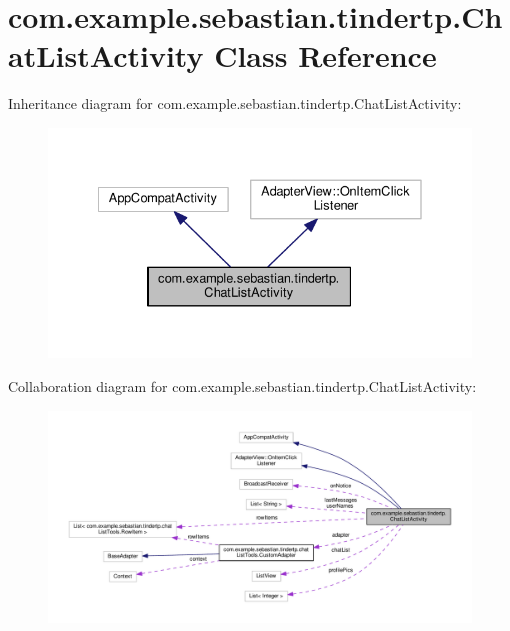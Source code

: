 \hypertarget{classcom_1_1example_1_1sebastian_1_1tindertp_1_1ChatListActivity}{}\section{com.\+example.\+sebastian.\+tindertp.\+Chat\+List\+Activity Class Reference}
\label{classcom_1_1example_1_1sebastian_1_1tindertp_1_1ChatListActivity}


Inheritance diagram for com.\+example.\+sebastian.\+tindertp.\+Chat\+List\+Activity\+:
\nopagebreak
\begin{figure}[H]
\begin{center}
\leavevmode
\includegraphics[width=331pt]{classcom_1_1example_1_1sebastian_1_1tindertp_1_1ChatListActivity__inherit__graph}
\end{center}
\end{figure}


Collaboration diagram for com.\+example.\+sebastian.\+tindertp.\+Chat\+List\+Activity\+:
\nopagebreak
\begin{figure}[H]
\begin{center}
\leavevmode
\includegraphics[width=350pt]{classcom_1_1example_1_1sebastian_1_1tindertp_1_1ChatListActivity__coll__graph}
\end{center}
\end{figure}
